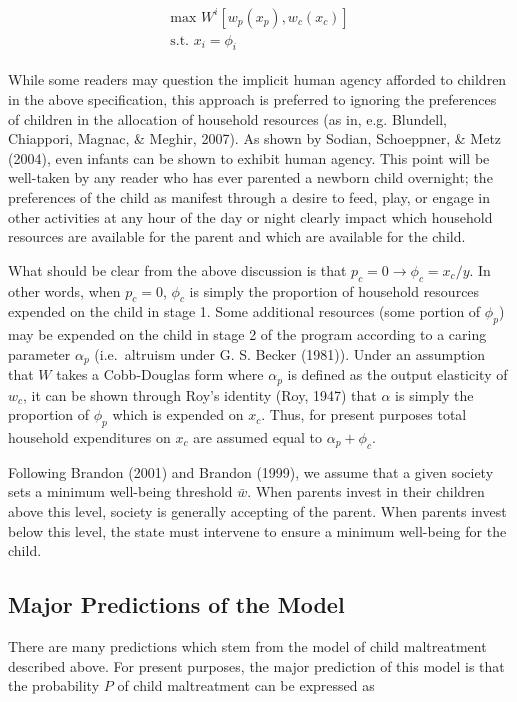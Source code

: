 \documentclass[]{elsarticle}
\begin{document}
\begin{align}\label{eqn:stage2}
\begin{split}
\text{max } W^i[w_p(x_p), w_c(x_c)]\\
\text{s.t. } x_i = \phi_i
\end{split}
\end{align}

While some readers may question the implicit human agency afforded to
children in the above specification, this approach is preferred to
ignoring the preferences of children in the allocation of household
resources (as in, e.g. Blundell, Chiappori, Magnac, \& Meghir, 2007). As
shown by Sodian, Schoeppner, \& Metz (2004), even infants can be shown
to exhibit human agency. This point will be well-taken by any reader who
has ever parented a newborn child overnight; the preferences of the
child as manifest through a desire to feed, play, or engage in other
activities at any hour of the day or night clearly impact which
household resources are available for the parent and which are available
for the child.

What should be clear from the above discussion is that
$p_c=0 \rightarrow \phi_c=x_c/y$. In other words, when $p_c=0$, $\phi_c$
is simply the proportion of household resources expended on the child in
stage 1. Some additional resources (some portion of $\phi_p$) may be
expended on the child in stage 2 of the program according to a caring
parameter $\alpha_p$ (i.e.~altruism under G. S. Becker (1981)). Under an
assumption that $W$ takes a Cobb-Douglas form where $\alpha_p$ is
defined as the output elasticity of $w_c$, it can be shown through Roy's
identity (Roy, 1947) that $\alpha$ is simply the proportion of $\phi_p$
which is expended on $x_c$. Thus, for present purposes total household
expenditures on $x_c$ are assumed equal to $\alpha_p + \phi_c$.

Following Brandon (2001) and Brandon (1999), we assume that a given
society sets a minimum well-being threshold $\bar{w}$. When parents
invest in their children above this level, society is generally
accepting of the parent. When parents invest below this level, the state
must intervene to ensure a minimum well-being for the child.

\subsection{Major Predictions of the
Model}\label{major-predictions-of-the-model}

There are many predictions which stem from the model of child
maltreatment described above. For present purposes, the major prediction
of this model is that the probability $P$ of child maltreatment can be
expressed as
\end{document}
